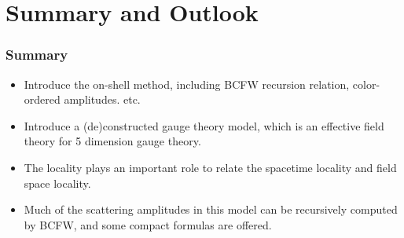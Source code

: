 \documentclass{beamer}
\begin{document}
\section{Summary and Outlook}
\begin{frame}
    \frametitle{Summary}
    \begin{itemize}
        \item Introduce the on-shell method, including BCFW recursion relation, color-ordered amplitudes. etc.
        \item Introduce a (de)constructed gauge theory model, which is an effective field theory for 5 dimension gauge theory.
        \item The locality plays an important role to relate the spacetime locality and field space locality.
        \item Much of the scattering amplitudes in this model can be recursively computed by BCFW, and some compact formulas are offered.
    \end{itemize}
\end{frame}
\end{document}
